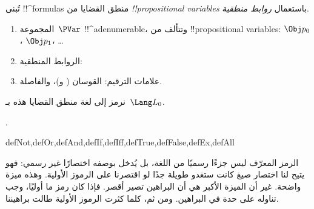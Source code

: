 \documentclass[../../../include/open-logic-section]{subfiles}
\begin{document}


تُبنى !!^{formula}s منطق القضايا من
\emph{!!{propositional
    variable}s} باستعمال \emph{روابط
  منطقية}.

\begin{enumerate}
\item المجموعة~$\PVar$ !!^a{denumerable}، وتتألف من
  !!{propositional variable}s: $\Obj p_0$، $\Obj p_1$، \dots
{}
\item الروابط المنطقية:
  \startycommalist
\item علامات الترقيم: القوسان ( و)، والفاصلة.
\end{enumerate}

نرمز إلى لغة منطق القضايا هذه بـ~$\Lang L_0$.

.

\begin{tagblock}{defNot,defOr,defAnd,defIf,defIff,defTrue,defFalse,defEx,defAll}
\begin{explain}
الرمز المعرّف ليس جزءًا رسميًا من اللغة، بل يُدخل بوصفه اختصارًا غير
رسمي: فهو يتيح لنا اختصار صيغ كانت ستغدو طويلة جدًا لو اقتصرنا على
الرموز الأولية. وهذه ميزة واضحة. غير أن الميزة الأكبر هي أن البراهين
تصير أقصر. فإذا كان رمز ما أوليًا، وجب تناوله على حدة في البراهين.
ومن ثم، كلما كثرت الرموز الأولية طالت براهيننا.
\end{explain}
\end{tagblock}

\end{document}
